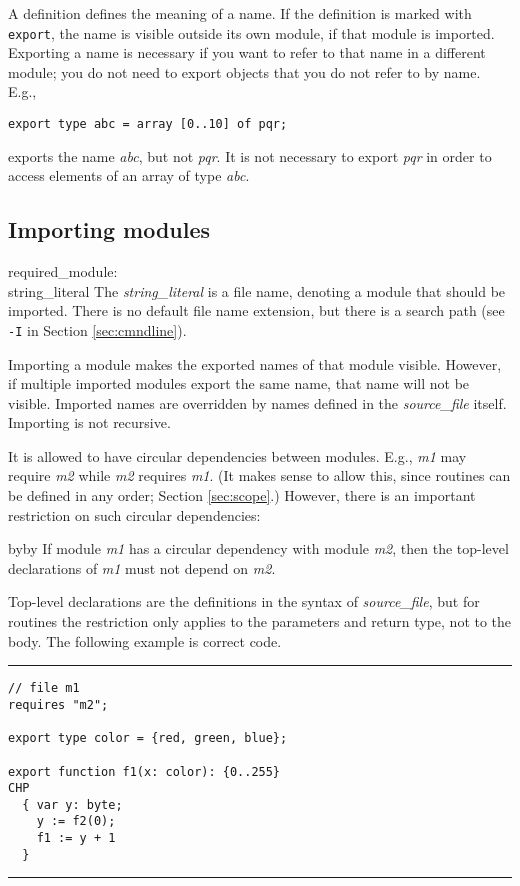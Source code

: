 A definition defines the meaning of a name. If the definition is marked
with {\tt{}export}, the name is visible outside its own module,
if that module is imported.
Exporting a name is necessary if you want to refer to that name in a
different module; you do
not need to export objects that you do not refer to by name. E.g.,
\begin{verbatim}
export type abc = array [0..10] of pqr;
\end{verbatim}
exports the name {\it{}abc}, but not {\it{}pqr}. It is not necessary to export
{\it{}pqr} in order to access elements of an array of type {\it{}abc}.

\subsection{Importing modules}\label{sec:import}

\grammarstart
required\_module: \\
       string\_literal\LIST {\tt{};}
\grammarend
The {\it{}string\_literal} is a file name, denoting a module that
should be imported. There is no default file name extension, but there
is a search path (see {\tt{}-I} in Section \ref{sec:cmndline}).

Importing a module makes the exported names of that module visible.
However, if multiple imported modules export the same name, that name will
not be visible. Imported names are overridden by names defined in the
{\it{}source\_file} itself. Importing is not recursive.

It is allowed to have circular dependencies between modules. E.g., {\it{}m1}
may require {\it{}m2} while {\it{}m2} requires {\it{}m1}. (It makes sense to allow this,
since routines can be defined in any order; Section \ref{sec:scope}.)
However, there is an important restriction on such circular dependencies:

\smallskip
{\advance\leftskip by\parindent \advance\rightskip by\parindent \noindent
If module {\it{}m1} has a circular dependency with module {\it{}m2}, then the top-level
declarations of {\it{}m1} must not depend on {\it{}m2}.

}\smallskip

\noindent Top-level declarations are the definitions in the syntax
of {\it{}source\_file}, but
for routines the restriction only applies to the parameters and return
type, not to the body. The following example is correct code.
\medskip
\hrule
\begin{verbatim}
// file m1
requires "m2";

export type color = {red, green, blue};

export function f1(x: color): {0..255}
CHP
  { var y: byte;
    y := f2(0);
    f1 := y + 1
  }
\end{verbatim}
\hrule

